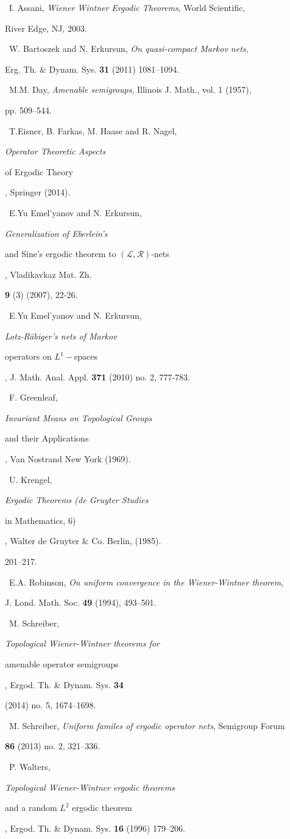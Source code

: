 \documentclass{amsart}
\theoremstyle{definition}
\theoremstyle{remark}
\numberwithin{equation}{section}
\begin{document}
\begin{thebibliography}{12}

\bibitem {} \ I. Assani, {\it Wiener Wintner Ergodic Theorems}, World Scientific,

River Edge, NJ, 2003.

\bibitem {} \ W. Bartoszek and N. Erkursun, {\it On quasi-compact Markov nets,}

Erg. Th. \& Dynam. Sys. {\bf 31} (2011) 1081--1094.

\bibitem {} \ M.M. Day, {\it Amenable semigroups}, Illinois J. Math., vol. 1 (1957),

pp. 509--544.

\bibitem {} \ T.Eisner, B. Farkas, M. Haase and R. Nagel, {\it Operator Theoretic Aspects

of Ergodic Theory}, Springer (2014).

\bibitem {} \ E.Yu Emel'yanov and N. Erkursun, {\it Generalization of Eberlein's

and Sine's ergodic theorem to $(\mathcal{L}, \mathcal{R})$-nets}, Vladikavkaz Mat. Zh.

{\bf 9} (3) (2007), 22-26.

\bibitem {} \ E.Yu Emel'yanov and N. Erkursun, {\it Lotz-R\"abiger's nets of Markov

operators on $L^1-$spaces}, J. Math. Anal. Appl. {\bf 371} (2010) no. 2, 777-783.

\bibitem {} \ F. Greenleaf, {\it Invariant Means on Topological Groups

and their Applications}, Van Nostrand New York (1969).

\bibitem {} \ U. Krengel, {\it Ergodic Theorems (de Gruyter Studies

in Mathematics, 6)}, Walter de Gruyter \& Co. Berlin, (1985).

201--217.

\bibitem {} \ E.A. Robinson, {\it On uniform convergence in the Wiener-Wintner theorem},

J. Lond. Math. Soc. {\bf 49} (1994), 493--501.

\bibitem {}  \ M. Schreiber, {\it Topological Wiener-Wintner theorems for

amenable operator semigroups}, Ergod. Th. \& Dynam. Sys. {\bf 34}

(2014) no. 5, 1674--1698.

\bibitem {} \ M. Schreiber, {\it Uniform familes of ergodic operator nets}, Semigroup Forum

{\bf 86} (2013) no. 2, 321--336.

\bibitem {} \ P. Walters, {\it Topological Wiener-Wintner ergodic theorems

and a random $L^2$ ergodic theorem}, Ergod. Th. \& Dynam. Sys. {\bf 16} (1996) 179--206.



\end{thebibliography}
\end{document}
